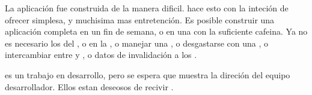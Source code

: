 La aplicación fue construida de la manera dificil. \meteor hace esto con la inteción de ofrecer simplesa, y muchisima mas entretención. Es posible construir una aplicación completa en un fin de semana, o en una \hackathon con la suficiente cafeina. Ya no es necesario los \resources del \server, o \deploy \api \apiendpoints en la \cloud, o manejar una \database, o desgastarse con una \orm \layer, o intercambiar \backandforth entre \javascript y \ruby, o \broadcast datos de invalidación a los \clients.

\meteor es un trabajo en desarrollo, pero se espera que muestra la direción del equipo desarrollador. Ellos estan deseosos de recivir \feedback. 

